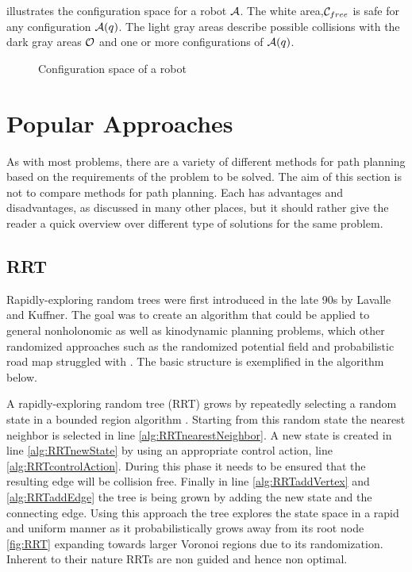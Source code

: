  illustrates the configuration space for a robot $\mathcal{A}$. The white area,$\mathcal{C}_{free}$ is safe for any configuration $\mathcal{A}(q)$. The light gray areas describe possible collisions with the dark gray areas $\mathcal{O}$ and one or more configurations of $\mathcal{A}(q)$.

\begin{figure}[h]
    \caption{Configuration space of a robot}
    \label{fig:configurationSpace}
\end{figure}

\section{Popular Approaches}
As with most problems, there are a variety of different methods for path planning based on the requirements of the problem to be solved. The aim of this section is not to compare methods for path planning. Each has advantages and disadvantages, as discussed in many other places, but it should rather give the reader a quick overview over different type of solutions for the same problem. %

\subsection{RRT}
Rapidly-exploring random trees were first introduced in the late 90s by Lavalle and Kuffner. The goal was to create an algorithm that could be applied to general nonholonomic as well as kinodynamic planning problems, which other randomized approaches such as the randomized potential field and probabilistic road map struggled with \cite{Lavalle.1998}. The basic structure is exemplified in the algorithm below.

A rapidly-exploring random tree (RRT) grows by repeatedly selecting a random state in a bounded region algorithm . Starting from this random state the nearest neighbor is selected in line \ref{alg:RRTnearestNeighbor}. A new state is created in line \ref{alg:RRTnewState} by using an appropriate control action, line \ref{alg:RRTcontrolAction}. During this phase it needs to be ensured that the resulting edge will be collision free. Finally in line \ref{alg:RRTaddVertex} and \ref{alg:RRTaddEdge} the tree is being grown by adding the new state and the connecting edge. Using this approach the tree explores the state space in a rapid and uniform manner as it probabilistically grows away from its root node \ref{fig:RRT} expanding towards larger Voronoi regions due to its randomization. Inherent to their nature RRTs are non guided and hence non optimal. \cite{Lavalle.1999}

